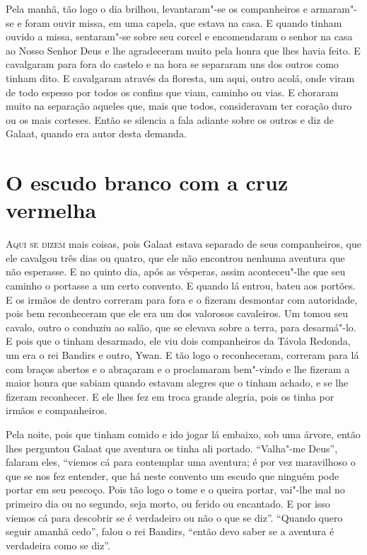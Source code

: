 Pela manhã, tão logo o dia brilhou, levantaram"-se os companheiros e armaram"-se e
foram ouvir missa, em uma capela, que estava na casa. E quando tinham ouvido a
missa, sentaram"-se sobre seu corcel e encomendaram o senhor na casa ao Nosso
Senhor Deus e lhe agradeceram muito pela honra que lhes havia feito. E
cavalgaram para fora do castelo e na hora se separaram uns dos outros como
tinham dito. E cavalgaram através da floresta, um aqui, outro acolá, onde viram
de todo espesso por todos os confins que viam, caminho ou vias. E choraram
muito na separação aqueles que, mais que todos, consideravam ter coração duro
ou os mais corteses. Então se silencia a fala adiante sobre os outros e diz de
Galaat, quando era autor desta demanda. 
\oneside

\chapter{O escudo branco com a cruz vermelha}

\textsc{Aqui se dizem} mais coisas, pois Galaat estava separado de seus companheiros, que
ele cavalgou três dias ou quatro, que ele não encontrou nenhuma aventura que
não esperasse. E no quinto dia, após as vésperas, assim aconteceu"-lhe que seu
caminho o portasse a um certo convento. E quando lá entrou, bateu aos portões.
E os irmãos de dentro correram para fora e o fizeram desmontar com autoridade,
pois bem reconheceram que ele era um dos valorosos cavaleiros. Um tomou seu
cavalo, outro o conduziu ao salão, que se elevava sobre a terra, para
desarmá"-lo. E pois que o tinham desarmado, ele viu dois companheiros da Távola
Redonda, um era o rei Bandirs e outro, Ywan. E tão logo o reconheceram,
correram para lá com braços abertos e o abraçaram e o proclamaram bem"-vindo e
lhe fizeram a maior honra que sabiam quando estavam alegres que o tinham
achado, e se lhe fizeram reconhecer. E ele lhes fez em troca grande alegria,
pois os tinha por irmãos e companheiros. 

Pela noite, pois que tinham comido e ido jogar lá embaixo, sob uma árvore,
então lhes perguntou Galaat que aventura os tinha ali portado. “Valha"-me Deus”,
falaram eles, “viemos cá para contemplar uma aventura; é por vez maravilhoso o
que se nos fez entender, que há neste convento um escudo que ninguém pode
portar em seu pescoço. Pois tão logo o tome e o queira portar, vai"-lhe mal no
primeiro dia ou no segundo, seja morto, ou ferido ou encantado. E por isso
viemos cá para descobrir se é verdadeiro ou não o que se diz”. “Quando quero
seguir amanhã cedo”, falou o rei Bandirs, “então devo saber se a aventura é
verdadeira como se diz”. 

